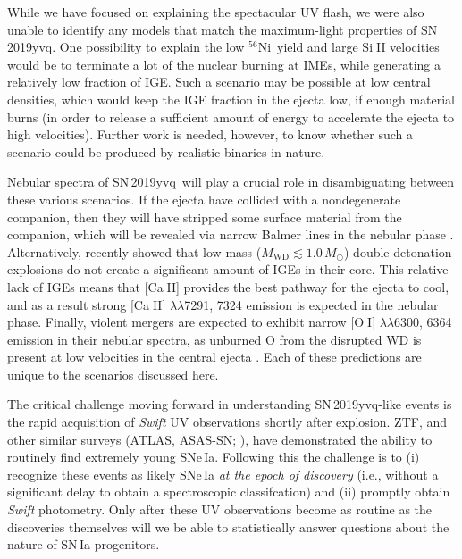 \documentclass[twocolumn]{aastex63}
\def\ion#1#2{#1$\;${\footnotesize\rm{#2}}\relax}
\newcommand{\radni}{$^{56}$Ni}
\newcommand{\sn}{SN\,2019yvq}
\begin{document}
While we have focused on explaining the spectacular UV flash, we were also
unable to identify any models that match the maximum-light properties of \sn.
One possibility to explain the low \radni\ yield and large \ion{Si}{II}
velocities would be to terminate a lot of the nuclear burning at IMEs, while
generating a relatively low fraction of IGE. Such a scenario may be possible
at low central densities, which would keep the IGE fraction in the ejecta low,
if enough material burns (in order to release a sufficient amount of energy to
accelerate the ejecta to high velocities). Further work is needed, however, to
know whether such a scenario could be produced by realistic binaries in nature.

Nebular spectra of \sn\ will play a crucial role in disambiguating between
these various scenarios. If the ejecta have collided with a nondegenerate
companion, then they will have stripped some surface material from the
companion, which will be revealed via narrow Balmer lines in the nebular phase
\citep[e.g.,][]{Wheeler75}. Alternatively, \citet{Polin19a} recently showed
that low mass ($M_\mathrm{WD} \lesssim 1.0\,M_\odot$) double-detonation
explosions do not create a significant amount of IGEs in their core. This
relative lack of IGEs means that [\ion{Ca}{II}] provides the best pathway for
the ejecta to cool, and as a result strong [\ion{Ca}{II}]
$\lambda\lambda$7291, 7324 emission is expected in the nebular phase. Finally,
violent mergers are expected to exhibit narrow [\ion{O}{I}]
$\lambda\lambda$6300, 6364 emission in their nebular spectra, as unburned O
from the disrupted WD is present at low velocities in the central ejecta
\citep{Taubenberger13,Kromer16}. Each of these predictions are unique to the
scenarios discussed here.

The critical challenge moving forward in understanding \sn-like events is the
rapid acquisition of \textit{Swift} UV observations shortly after explosion.
ZTF, and other similar surveys (ATLAS, ASAS-SN; \citealt{Tonry11,Holoien17}),
have demonstrated the ability to routinely find extremely young SNe\,Ia.
Following this the challenge is to (i) recognize these events as likely
SNe\,Ia \textit{at the epoch of discovery} (i.e., without a significant delay
to obtain a spectroscopic classifcation) and (ii) promptly obtain
\textit{Swift} photometry. Only after these UV observations become as routine
as the discoveries themselves will we be able to statistically answer
questions about the nature of SN\,Ia progenitors.


\acknowledgements
\end{document}
